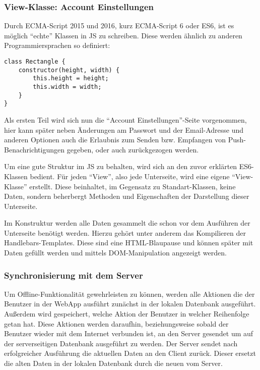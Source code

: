 \documentclass[a4paper,12pt,ngerman]{scrartcl}      %
\begin{document}
	\subsubsection{View-Klasse: Account Einstellungen}
	Durch ECMA-Script 2015 und 2016, kurz ECMA-Script 6 oder ES6, ist es möglich ``echte'' Klassen in JS zu schreiben. Diese werden ähnlich zu anderen Programmiersprachen so definiert:\par
	\begin{verbatim}
class Rectangle {
    constructor(height, width) {
        this.height = height;
        this.width = width;
    }
}
	\end{verbatim}
	Als ersten Teil wird sich nun die ``Account Einstellungen''-Seite vorgenommen, hier kann später neben Änderungen am Passwort und der Email-Adresse und anderen Optionen auch die Erlaubnis zum Senden bzw. Empfangen von Push-Be\-nach\-rich\-ti\-gungen gegeben, oder auch zurückgezogen werden.\par
	Um eine gute Struktur im JS zu behalten, wird sich an den zuvor erklärten ES6-Klassen bedient. Für jeden ``View'', also jede Unterseite, wird eine eigene ``View-Klasse'' erstellt. Diese beinhaltet, im Gegensatz zu Standart-Klassen, keine Daten, sondern beherbergt Methoden und Eigenschaften der Darstellung dieser Unterseite.\par
	Im Konstruktur werden alle Daten gesammelt die schon vor dem Ausführen der Unterseite benötigt werden. Hierzu gehört unter anderem das Kompilieren der Handlebars-Templates. Diese sind eine HTML-Blaupause und können später mit Daten gefüllt werden und mittels DOM-Manipulation angezeigt werden.\par
	
	\subsubsection{Synchronisierung mit dem Server}
	Um Offline-Funktionalität gewehrleisten zu können, werden alle Aktionen die der Benutzer in der WebApp ausführt zunächst in der lokalen Datenbank ausgeführt. Außerdem wird gespeichert, welche Aktion der Benutzer in welcher Reihenfolge getan hat. Diese Aktionen werden daraufhin, beziehungsweise sobald der Benutzer wieder mit dem Internet verbunden ist, an den Server gesendet um auf der serverseitigen Datenbank ausgeführt zu werden. Der Server sendet nach erfolgreicher Ausführung die aktuellen Daten an den Client zurück. Dieser ersetzt die alten Daten in der lokalen Datenbank durch die neuen vom Server.\par
	\newpage
\end{document}
